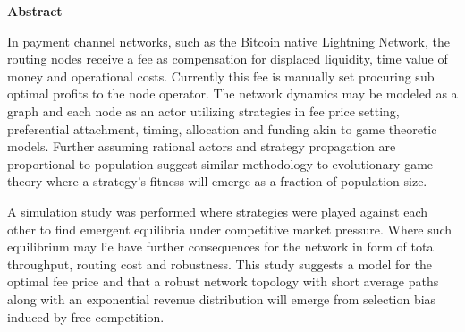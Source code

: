\begin{center}
	\textbf{Abstract}
\end{center} 

In payment channel networks, such as the Bitcoin native Lightning Network, the routing nodes receive a fee as compensation for displaced liquidity, time value of money and operational costs. Currently this fee is manually set procuring sub optimal profits to the node operator. The network dynamics may be modeled as a graph and each node as an actor utilizing strategies in fee price setting, preferential attachment, timing, allocation and funding akin to game theoretic models. Further assuming rational actors and strategy propagation are proportional to population suggest similar methodology to evolutionary game theory where a strategy's fitness will emerge as a fraction of population size. 

A simulation study was performed where strategies were played against each other to find emergent equilibria under competitive market pressure. Where such equilibrium may lie have further consequences for the network in form of total throughput, routing cost and robustness. This study suggests a model for the optimal fee price and that a robust network topology with short average paths along with an exponential revenue distribution will emerge from selection bias induced by free competition.

